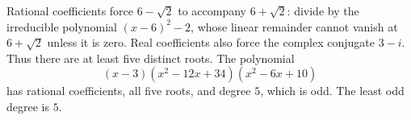 Rational coefficients force $6-\sqrt2$ to accompany $6+\sqrt2$: divide by the irreducible polynomial $(x-6)^2-2$, whose linear remainder cannot vanish at $6+\sqrt2$ unless it is zero. Real coefficients also force the complex conjugate $3-i$. Thus there are at least five distinct roots. The polynomial
\[
\boxed{(x-3)(x^2-12x+34)(x^2-6x+10)}
\]
has rational coefficients, all five roots, and degree $5$, which is odd. The least odd degree is $\boxed5$.

